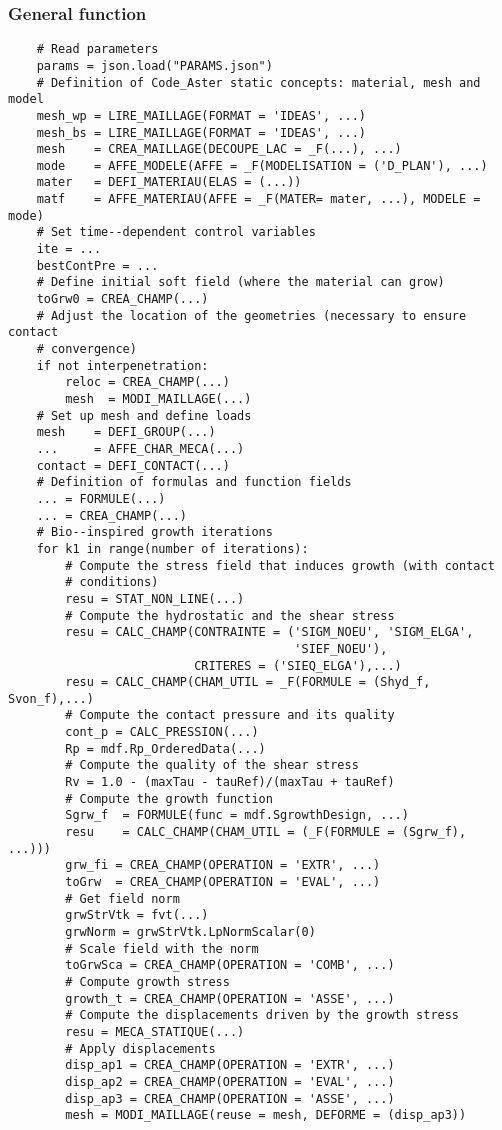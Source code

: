 \documentclass{article}
\begin{document}
\subsubsection{General function}
\begin{verbatim}
    # Read parameters
    params = json.load("PARAMS.json")
    # Definition of Code_Aster static concepts: material, mesh and model
    mesh_wp = LIRE_MAILLAGE(FORMAT = 'IDEAS', ...)
    mesh_bs = LIRE_MAILLAGE(FORMAT = 'IDEAS', ...)
    mesh    = CREA_MAILLAGE(DECOUPE_LAC = _F(...), ...)
    mode    = AFFE_MODELE(AFFE = _F(MODELISATION = ('D_PLAN'), ...)
    mater   = DEFI_MATERIAU(ELAS = (...))
    matf    = AFFE_MATERIAU(AFFE = _F(MATER= mater, ...), MODELE = mode)
    # Set time--dependent control variables
    ite = ...
    bestContPre = ...
    # Define initial soft field (where the material can grow)
    toGrw0 = CREA_CHAMP(...)
    # Adjust the location of the geometries (necessary to ensure contact
    # convergence)
    if not interpenetration:
        reloc = CREA_CHAMP(...)
        mesh  = MODI_MAILLAGE(...)
    # Set up mesh and define loads
    mesh    = DEFI_GROUP(...)
    ...     = AFFE_CHAR_MECA(...)
    contact = DEFI_CONTACT(...)
    # Definition of formulas and function fields
    ... = FORMULE(...)
    ... = CREA_CHAMP(...)
    # Bio--inspired growth iterations
    for k1 in range(number of iterations):
        # Compute the stress field that induces growth (with contact
        # conditions)
        resu = STAT_NON_LINE(...)
        # Compute the hydrostatic and the shear stress
        resu = CALC_CHAMP(CONTRAINTE = ('SIGM_NOEU', 'SIGM_ELGA',
                                        'SIEF_NOEU'),
                          CRITERES = ('SIEQ_ELGA'),...)
        resu = CALC_CHAMP(CHAM_UTIL = _F(FORMULE = (Shyd_f, Svon_f),...)
        # Compute the contact pressure and its quality
        cont_p = CALC_PRESSION(...)
        Rp = mdf.Rp_OrderedData(...)
        # Compute the quality of the shear stress
        Rv = 1.0 - (maxTau - tauRef)/(maxTau + tauRef)
        # Compute the growth function
        Sgrw_f  = FORMULE(func = mdf.SgrowthDesign, ...)
        resu    = CALC_CHAMP(CHAM_UTIL = (_F(FORMULE = (Sgrw_f), ...)))
        grw_fi = CREA_CHAMP(OPERATION = 'EXTR', ...)
        toGrw  = CREA_CHAMP(OPERATION = 'EVAL', ...)
        # Get field norm
        grwStrVtk = fvt(...)
        grwNorm = grwStrVtk.LpNormScalar(0)
        # Scale field with the norm
        toGrwSca = CREA_CHAMP(OPERATION = 'COMB', ...)
        # Compute growth stress
        growth_t = CREA_CHAMP(OPERATION = 'ASSE', ...)
        # Compute the displacements driven by the growth stress
        resu = MECA_STATIQUE(...)
        # Apply displacements
        disp_ap1 = CREA_CHAMP(OPERATION = 'EXTR', ...)
        disp_ap2 = CREA_CHAMP(OPERATION = 'EVAL', ...)
        disp_ap3 = CREA_CHAMP(OPERATION = 'ASSE', ...)
        mesh = MODI_MAILLAGE(reuse = mesh, DEFORME = (disp_ap3))
\end{verbatim}
\end{document}
